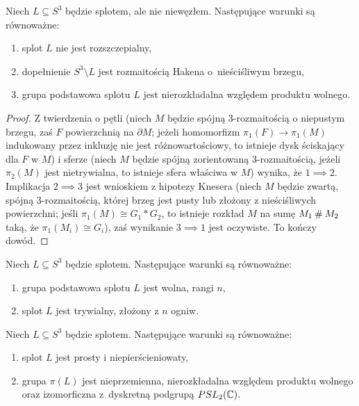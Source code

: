 \begin{proposition}
    Niech $L \subseteq S^3$ będzie splotem, ale nie niewęzłem.
    Następujące warunki są równoważne:
    \begin{enumerate}
        \item splot $L$ nie jest rozszczepialny,
%
        \item dopełnienie $S^3 
        \setminus L$ jest rozmaitością Hakena o~nieściśliwym brzegu,
%
        \item grupa podstawowa splotu $L$ jest nierozkładalna względem produktu wolnego.
    \end{enumerate}
\end{proposition}

\begin{proof}
    Z twierdzenia o pętli (niech $M$ będzie spójną 3-rozmaitością o niepustym brzegu, zaś $F$ powierzchnią na $\partial M$; jeżeli homomorfizm $\pi_1(F) \to \pi_1(M)$ indukowany przez inkluzję nie jest różnowartościowy, to istnieje dysk ściskający dla $F$ w $M$) i sferze (niech $M$ będzie spójną zorientowaną 3-rozmaitością, jeżeli $\pi_2(M)$ jest nietrywialna, to istnieje sfera właściwa w $M$) wynika, że $1 \implies 2$.
    Implikacja $2 \implies 3$ jest wnioskiem z hipotezy Knesera (niech $M$ będzie zwartą, spójną 3-rozmaitością, której brzeg jest pusty lub złożony z nieściśliwych powierzchni; jeśli $\pi_1(M) \cong G_1 * G_2$, to istnieje rozkład $M$ na sumę $M_1 \mathbin{\#} M_2$ taką, że $\pi_1(M_i) \cong G_i$), zaś wynikanie $3 \implies 1$ jest oczywiste.
%
%
%
    To kończy dowód.
\end{proof}

\begin{corollary}
    Niech $L \subseteq S^3$ będzie splotem.
    Następujące warunki są równoważne:
    \begin{enumerate}
        \item grupa podstawowa splotu $L$ jest wolna, rangi $n$,
        \item splot $L$ jest trywialny, złożony z $n$ ogniw.
    \end{enumerate}
\end{corollary}

\begin{proposition}
    Niech $L \subseteq S^3$ będzie splotem.
    Następujące warunki są równoważne:
    \begin{enumerate}
        \item splot $L$ jest prosty i niepierścieniowaty,
        \item grupa $\pi(L)$ jest nieprzemienna, nierozkładalna względem produktu wolnego oraz izomorficzna z~dyskretną podgrupą $PSL_2(\mathbb C)$.
    \end{enumerate}
\end{proposition}

